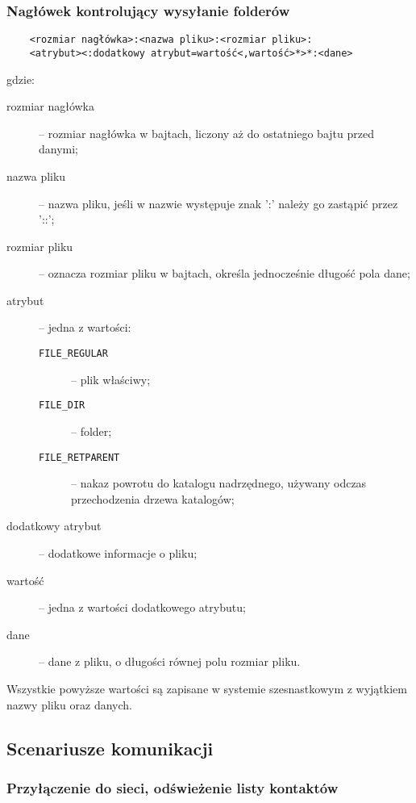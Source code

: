 \documentclass[11pt,leqno]{article}
\begin{document}
\subsubsection{Nagłówek kontrolujący wysyłanie folderów}\label{sec:hierarchicalFileHeader}

\begin{verbatim}
	<rozmiar nagłówka>:<nazwa pliku>:<rozmiar pliku>:
	<atrybut><:dodatkowy atrybut=wartość<,wartość>*>*:<dane>
\end{verbatim}

gdzie:
\begin{description}
	\item[rozmiar nagłówka] -- rozmiar nagłówka w bajtach, liczony aż do ostatniego bajtu przed danymi;
	\item[nazwa pliku] -- nazwa pliku, jeśli w nazwie występuje znak ':' należy go zastąpić przez '::';
	\item[rozmiar pliku] -- oznacza rozmiar pliku w bajtach, określa jednocześnie długość pola dane;
	\item[atrybut] -- jedna z wartości:
	\begin{description}
		\item[\textnormal{\texttt{FILE\_REGULAR}}] -- plik właściwy;
		\item[\textnormal{\texttt{FILE\_DIR}}] -- folder;
		\item[\textnormal{\texttt{FILE\_RETPARENT}}] -- nakaz powrotu do katalogu nadrzędnego,
		używany odczas przechodzenia drzewa katalogów;
	\end{description}
	\item[dodatkowy atrybut] -- dodatkowe informacje o pliku;
	\item[wartość] -- jedna z wartości dodatkowego atrybutu;
	\item[dane] -- dane z pliku, o długości równej polu rozmiar pliku.
\end{description}
Wszystkie powyższe wartości są zapisane w systemie szesnastkowym z wyjątkiem nazwy pliku oraz danych.

\subsection{Scenariusze komunikacji}

\subsubsection{Przyłączenie do sieci, odświeżenie listy kontaktów}
\end{document}
